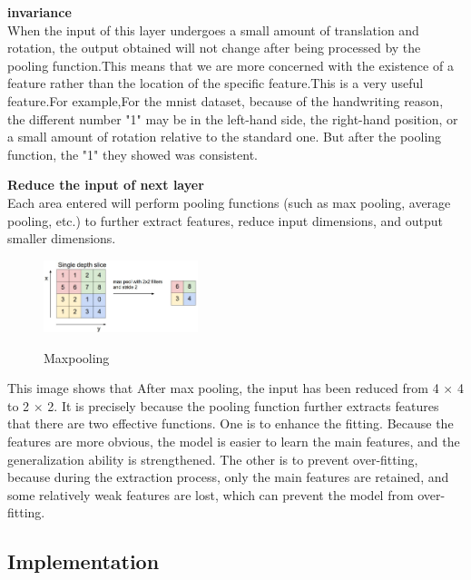 \documentclass{article}
\begin{document}
\textbf{invariance}\\
When the input of this layer undergoes a small amount of translation and rotation, the output obtained will not change after being processed by the pooling function\cite{deeplearning2016}.This means that we are more concerned with the existence of a feature rather than the location of the specific feature.This is a very useful feature.For example,For the mnist dataset, because of the handwriting reason, the different number "1" may be in the left-hand side, the right-hand position, or a small amount of rotation relative to the standard one. But after the pooling function, the "1" they showed was consistent.

\textbf{Reduce the input of next layer}\\
Each area entered will perform pooling functions (such as max pooling, average pooling, etc.) to further extract features, reduce input dimensions, and output smaller dimensions.
\begin{figure}[H] %
		\centering %
		\includegraphics[width=0.4\textwidth]{./pic/part1/maxpool.jpeg} %
		\caption{Maxpooling} %
		\label{Fig.main2} %
		\cite{cs231n}
\end{figure}
This image shows that After max pooling, the input has been reduced from 4 $\times$ 4 to 2 $\times$ 2.
It is precisely because the pooling function further extracts features that there are two effective functions. One is to enhance the fitting. Because the features are more obvious, the model is easier to learn the main features, and the generalization ability is strengthened. The other is to prevent over-fitting, because during the extraction process, only the main features are retained, and some relatively weak features are lost, which can prevent the model from over-fitting.

\subsection{Implementation}
\end{document}
